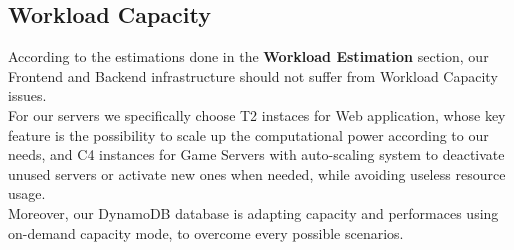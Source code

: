 \subsection{Workload Capacity}
According to the estimations done in the \textbf{Workload Estimation} section, our Frontend and Backend infrastructure should not suffer from Workload Capacity issues.\\
For our servers we specifically choose T2 instaces for Web application, whose key feature is the possibility to scale up the computational power according to our needs, and C4 instances for Game Servers with auto-scaling system to deactivate unused servers or activate new ones when needed, while avoiding useless resource usage.\\
Moreover, our DynamoDB database is adapting capacity and performaces using on-demand capacity mode, to overcome every possible scenarios.\\